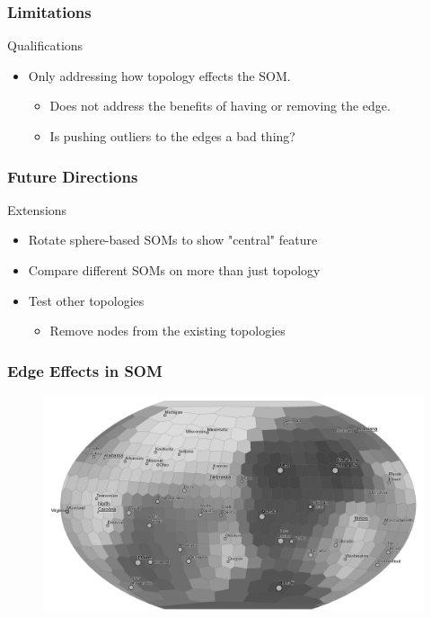 \documentclass[nototal,handout]{beamer}
\begin{document}
\begin{frame}
	\frametitle{Limitations}
 
\begin{block}{Qualifications}
 \begin{itemize}
 \item  Only addressing how topology effects the SOM.
 \begin{itemize}
 \item  Does not address the benefits of having or removing the edge.
 \item  Is pushing outliers to the edges a bad thing?
 \end{itemize}
 \end{itemize}
 \end{block} \end{frame} 

\begin{frame}
	\frametitle{Future Directions}
 
\begin{block}{Extensions}
 \begin{itemize}
 \item  Rotate sphere-based SOMs to show "central" feature
 \item  Compare different SOMs on more than just topology
 \item  Test other topologies
 \begin{itemize}
 \item  Remove nodes from the existing topologies
 \end{itemize}
 \end{itemize}
 \end{block} \end{frame} 

\begin{frame}
	\frametitle{Edge Effects in SOM}
  \begin{center}
  \begin{figure}
  \includegraphics[width=0.60\linewidth]{statesSphere.png}
  \end{figure}
  \end{center}
 \end{frame}
\end{document}
